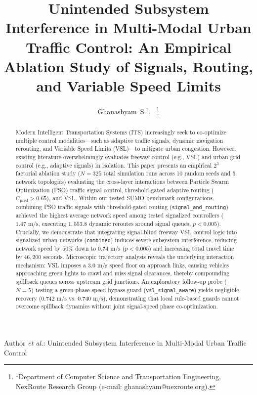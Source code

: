 \documentclass[journal,twocolumn]{IEEEtran}
\begin{document}
\title{Unintended Subsystem Interference in Multi-Modal Urban Traffic Control: An Empirical Ablation Study of Signals, Routing, and Variable Speed Limits}

\author{Ghanashyam~S.$^{1}$,~
\thanks{$^{1}$Department of Computer Science and Transportation Engineering, NexRoute Research Group (e-mail: ghanashyam@nexroute.org).}}

%
{Author \MakeLowercase{\textit{et al.}}: Unintended Subsystem Interference in Multi-Modal Urban Traffic Control}

\maketitle

\begin{abstract}
Modern Intelligent Transportation Systems (ITS) increasingly seek to co-optimize multiple control modalities—such as adaptive traffic signals, dynamic navigation rerouting, and Variable Speed Limits (VSL)—to mitigate urban congestion. However, existing literature overwhelmingly evaluates freeway control (e.g., VSL) and urban grid control (e.g., adaptive signals) in isolation. This paper presents an empirical $2^3$ factorial ablation study ($N=325$ total simulation runs across 10 random seeds and 5 network topologies) evaluating the cross-layer interactions between Particle Swarm Optimization (PSO) traffic signal control, threshold-gated adaptive routing ($C_{\text{pred}} > 0.65$), and VSL. Within our tested SUMO benchmark configurations, combining PSO traffic signals with threshold-gated routing (\texttt{signal\_and\_routing}) achieved the highest average network speed among tested signalized controllers ($1.47\text{ m/s}$, executing $1,553.8$ dynamic reroutes around signal queues, $p < 0.005$). Crucially, we demonstrate that integrating signal-blind freeway VSL control logic into signalized urban networks (\texttt{combined}) induces severe subsystem interference, reducing network speed by $50\%$ down to $0.74\text{ m/s}$ ($p < 0.005$) and increasing total travel time by $46,200\text{ seconds}$. Microscopic trajectory analysis reveals the underlying interaction mechanism: VSL imposes a $3.0\text{ m/s}$ speed floor on approach links, causing vehicles approaching green lights to crawl and miss signal clearances, thereby compounding spillback queues across upstream grid junctions. An exploratory follow-up probe ($N=5$) testing a green-phase speed bypass guard (\texttt{vsl\_signal\_aware}) yields negligible recovery ($0.742\text{ m/s}$ vs. $0.740\text{ m/s}$), demonstrating that local rule-based guards cannot overcome spillback dynamics without joint signal-speed phase co-optimization.
\end{abstract}
\end{document}
